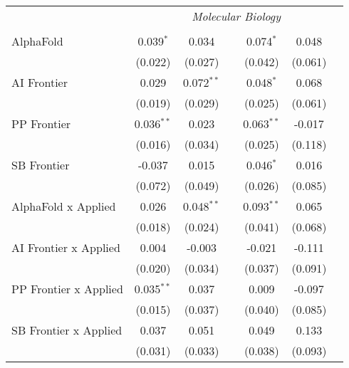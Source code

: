 \begin{tabular}{lcccccc}
 & \multicolumn{6}{c}{\textit{Molecular Biology}} \\ \\
   AlphaFold                      & 0.039$^{*}$  & 0.034        &                & 0.074$^{*}$  & 0.048   &   \\   
                                  & (0.022)      & (0.027)      &                & (0.042)      & (0.061) &   \\   
   AI Frontier                    & 0.029        & 0.072$^{**}$ &                & 0.048$^{*}$  & 0.068   &   \\   
                                  & (0.019)      & (0.029)      &                & (0.025)      & (0.061) &   \\   
   PP Frontier                    & 0.036$^{**}$ & 0.023        &                & 0.063$^{**}$ & -0.017  &   \\   
                                  & (0.016)      & (0.034)      &                & (0.025)      & (0.118) &   \\   
   SB Frontier                    & -0.037       & 0.015        &                & 0.046$^{*}$  & 0.016   &   \\   
                                  & (0.072)      & (0.049)      &                & (0.026)      & (0.085) &   \\   
   AlphaFold x Applied            & 0.026        & 0.048$^{**}$ &                & 0.093$^{**}$ & 0.065   &   \\   
                                  & (0.018)      & (0.024)      &                & (0.041)      & (0.068) &   \\   
   AI Frontier x Applied          & 0.004        & -0.003       &                & -0.021       & -0.111  &   \\   
                                  & (0.020)      & (0.034)      &                & (0.037)      & (0.091) &   \\   
   PP Frontier x Applied          & 0.035$^{**}$ & 0.037        &                & 0.009        & -0.097  &   \\   
                                  & (0.015)      & (0.037)      &                & (0.040)      & (0.085) &   \\   
   SB Frontier x Applied          & 0.037        & 0.051        &                & 0.049        & 0.133   &   \\   
                                  & (0.031)      & (0.033)      &                & (0.038)      & (0.093) &   \\   

\end{tabular}

